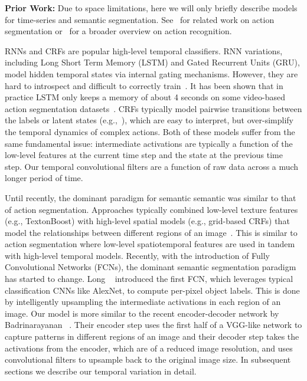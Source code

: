 \documentclass[10pt,twocolumn,letterpaper]{article}
\newcommand{\fakesubsection}[1]{\smallskip\noindent\textbf{#1:}}
\begin{document}
\fakesubsection{Prior Work}
Due to space limitations, here we will only briefly describe models for time-series and semantic segmentation. See~\cite{lea_eccv_2016} for related work on action segmentation or~\cite{vrigkas_frontiers_2015} for a broader overview on action recognition. 



RNNs and CRFs are popular high-level temporal classifiers. 
RNN variations, including Long Short Term Memory (LSTM) and Gated Recurrent Units (GRU), model hidden temporal states via internal gating mechanisms. However, they are hard to introspect and difficult to correctly train~\cite{pascanu_icml_2013}.
It has been shown that in practice LSTM only keeps a memory of about 4 seconds on some video-based action segmentation datasets~\cite{singh_cvpr_2016}.
CRFs typically model pairwise transitions between the labels or latent states (e.g.,~\cite{lea_eccv_2016}), 
which are easy to interpret, but over-simplify the temporal dynamics of complex actions.
Both of these models suffer from the same fundamental issue: intermediate activations are typically a function of the low-level features at the current time step and the state at the previous time step. Our temporal convolutional filters are a function of raw data across a much longer period of time.


Until recently, the dominant paradigm for semantic semantic was similar to that of action segmentation. Approaches typically
combined low-level texture features (e.g., TextonBoost) with high-level spatial models (e.g., grid-based CRFs) that model the relationships between different regions of an image~\cite{krahenbuhl_nips_2011}. 
This is similar to action segmentation where low-level spatiotemporal features are used in tandem with high-level temporal models. 
Recently, with the introduction of Fully Convolutional Networks (FCNs), the dominant semantic segmentation paradigm has started to change.
Long \etal~\cite{long_cvpr_2015} introduced the first FCN, which leverages typical classification CNNs like AlexNet, to compute per-pixel object labels. This is done by intelligently upsampling the intermediate activations in each region of an image.
Our model is more similar to the recent encoder-decoder network by Badrinarayanan \etal~\cite{badrinarayanan_arxiv_2015}. Their encoder step uses the first half of a VGG-like network to capture patterns in different regions of an image and their decoder step takes the activations from the encoder, which are of a reduced image resolution, and uses convolutional filters to upsample back to the original image size. In subsequent sections we describe our temporal variation in detail. 
\end{document}
